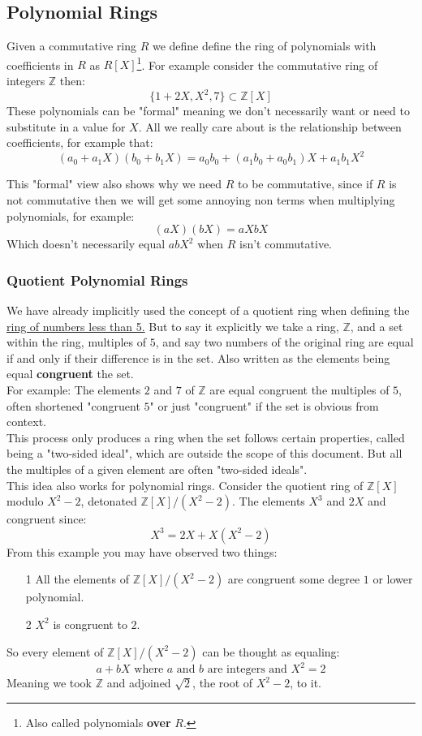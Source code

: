 \subsection{Polynomial Rings}
Given a commutative ring $R$ we define define the ring of polynomials with coefficients in $R$ as $R[X]$\footnote{Also called polynomials {\bf over} $R$.}.
For example consider the commutative ring of integers $\mathbb{Z}$ then:
\[ \{1+2X,X^2,7\} \subset \mathbb{Z}[X]\]
These polynomials can be "formal" meaning we don't necessarily want or need to substitute in a value for $X$.
All we really care about is the relationship between coefficients,
for example that:
\[(a_0+a_1X)(b_0+b_1X) = a_0b_0 + (a_1b_0+a_0b_1)X+a_1b_1X^2\]

This "formal" view also shows why we need $R$ to be commutative,
since if $R$ is not commutative then we will get some annoying non terms when multiplying polynomials,
for example:
\[(aX)(bX) = aXbX \]
Which doesn't necessarily equal $abX^2$ when $R$ isn't commutative.

\subsubsection{Quotient Polynomial Rings}
\label{appx:quotient-polynomial-ring}
We have already implicitly used the concept of a quotient ring when defining the \hyperref[intro:gf5]{ring of numbers less than 5.}
But to say it explicitly we take a ring,
$\mathbb{Z}$,
and a set within the ring, 
multiples of $5$, 
and say two numbers of the original ring are equal if and only if their difference is in the set.
Also written as the elements being equal {\bf congruent} the set.
\\

For example:
The elements $2$ and $7$ of $\mathbb{Z}$ are equal congruent the multiples of $5$,
often shortened "congruent $5$" or just "congruent" if the set is obvious from context.
\\

This process only produces a ring when the set follows certain properties,
called being a "two-sided ideal",
which are outside the scope of this document.
But all the multiples of a given element are often "two-sided ideals".
\\

This idea also works for polynomial rings.
Consider the quotient ring of $\mathbb{Z}[X]$ modulo $X^2-2$,
detonated $\mathbb{Z}[X] / (X^2-2)$.
The elements $X^3$ and $2X$ and congruent since:
\[X^3 = 2X + X(X^2-2)\]
From this example you may have observed two things:
\begin{itemize}
	\item[1] All the elements of $\mathbb{Z}[X] / (X^2 -2)$ are congruent some degree $1$ or lower polynomial.
	\item[2] $X^2$ is congruent to $2$.
\end{itemize}
So every element of $\mathbb{Z}[X] / (X^2 - 2)$ can be thought as equaling:
\[ a+bX \text{ where $a$ and $b$ are integers and } X^2 = 2\]
Meaning we took $\mathbb{Z}$ and adjoined $\sqrt{2}$, the root of $X^2-2$, to it.

